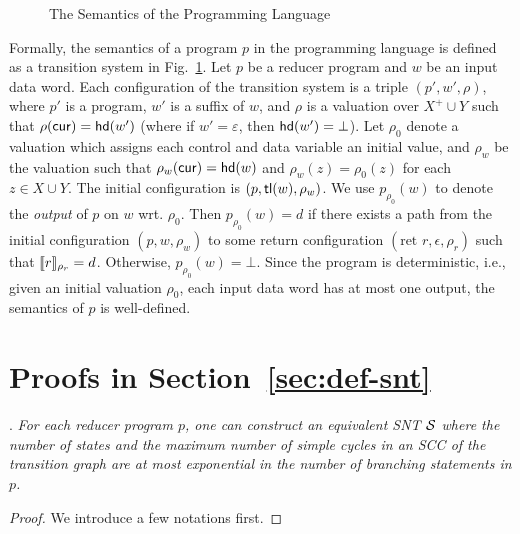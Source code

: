 \begin{appendix}
\begin{figure}
\begin{center}
{\begin{tabular}{|l|l|}
			\hline
			
		\end{tabular}
	}
	\caption{The Semantics of the Programming Language}
	\label{fig:semantics}
\end{center}
\end{figure}


Formally, the semantics of a program $p$ in the programming language is defined as a transition system in Fig.~\ref{fig:semantics}. Let $p$ be a reducer program and $w$ be an input data word.  Each configuration of the transition system is a triple $(p', w', \rho)$, where $p'$ is a program, $w'$ is a suffix of $w$, and $\rho$ is a valuation over $X^+\cup Y$ such that $\rho(\mathsf{cur})=\mathsf{hd}(w')$ (where if $w'=\varepsilon$, then $\mathsf{hd}(w')=\bot$). 
Let $\rho_0$ denote a valuation which assigns each control and data variable an initial value, and $\rho_w$ be the valuation such that $\rho_w(\mathsf{cur})=\mathsf{hd}(w)$ and $\rho_w(z) = \rho_0(z)$ for each $z \in X \cup Y$.
The initial configuration is $(p, \mathsf{tl}(w), \rho_w)$.
We use $p_{\rho_0}(w)$ to denote the \emph{output} of $p$ on $w$ wrt. $\rho_0$. Then $p_{\rho_0}(w) =d$ if there exists a path from the initial configuration $(p, w, \rho_w)$ to some return configuration $(\mbox{ret }r,  \epsilon, \rho_r)$ such that $
\llbracket r\rrbracket_{\rho_r}=d$. Otherwise, $p_{\rho_0}(w)=\bot$. Since the program is deterministic, i.e., given an initial valuation $\rho_0$, each input data word has at most one output, the semantics of $p$ is well-defined.

\section{Proofs in Section~\ref{sec:def-snt}}




\newcommand\assume{\mathsf{assume}}

\newcommand\loc{\mathfrak{l}}

.
{\it 
For each reducer program $p$, one can construct an equivalent SNT ${\mathcal{S} }$ where the number of states and the maximum number of simple cycles in an SCC of the transition graph are at most exponential in the number of branching statements in $p$. 
}

\smallskip

\begin{proof}
We introduce a few notations first.


\end{proof}
\end{appendix}
